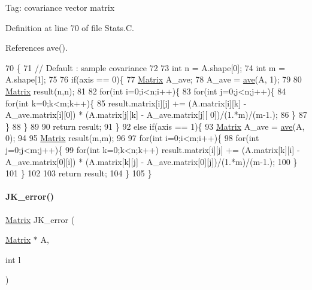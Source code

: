 Tag\+: covariance vector matrix 

Definition at line 70 of file Stats.\+C.



References ave().


\begin{DoxyCode}
70                               \{
71   \textcolor{comment}{// Default : sample covariance}
72 
73   \textcolor{keywordtype}{int} n = A.shape[0];
74   \textcolor{keywordtype}{int} m = A.shape[1];
75   
76   \textcolor{keywordflow}{if}(axis == 0)\{
77     \hyperlink{classMatrix}{Matrix} A\_ave;
78     A\_ave = \hyperlink{Stats_8C_ae39b64f2f2f119f1fd195d6ca0583a6f}{ave}(A, 1);
79 
80     \hyperlink{classMatrix}{Matrix} result(n,n);
81 
82     \textcolor{keywordflow}{for}(\textcolor{keywordtype}{int} i=0;i<n;i++)\{
83       \textcolor{keywordflow}{for}(\textcolor{keywordtype}{int} j=0;j<n;j++)\{
84         \textcolor{keywordflow}{for}(\textcolor{keywordtype}{int} k=0;k<m;k++)\{
85           result.matrix[i][j] += (A.matrix[i][k] - A\_ave.matrix[i][0]) * (A.matrix[j][k] - A\_ave.matrix[j][
      0])/(1.*m)/(m-1.);
86         \}
87       \}
88     \}
89 
90     \textcolor{keywordflow}{return} result;
91   \}
92   \textcolor{keywordflow}{else} \textcolor{keywordflow}{if}(axis == 1)\{
93     \hyperlink{classMatrix}{Matrix} A\_ave = \hyperlink{Stats_8C_ae39b64f2f2f119f1fd195d6ca0583a6f}{ave}(A, 0);
94 
95     \hyperlink{classMatrix}{Matrix} result(m,m);
96 
97     \textcolor{keywordflow}{for}(\textcolor{keywordtype}{int} i=0;i<m;i++)\{
98       \textcolor{keywordflow}{for}(\textcolor{keywordtype}{int} j=0;j<m;j++)\{
99         \textcolor{keywordflow}{for}(\textcolor{keywordtype}{int} k=0;k<n;k++) result.matrix[i][j] += (A.matrix[k][i] - A\_ave.matrix[0][i]) * (A.matrix[k][j]
       - A\_ave.matrix[0][j])/(1.*m)/(m-1.);
100       \}
101     \}
102 
103     \textcolor{keywordflow}{return} result;
104   \}
105 \}
\end{DoxyCode}
\mbox{\label{Stats_8C_a0285e96e7ca20265cc8af9eafc5bbb3b}} 
\paragraph{\texorpdfstring{J\+K\+\_\+error()}{JK\_error()}}
{\footnotesize\ttfamily \hyperlink{classMatrix}{Matrix} J\+K\+\_\+error (\begin{DoxyParamCaption}\item[{\hyperlink{classMatrix}{Matrix} $\ast$}]{A,  }\item[{int}]{l }\end{DoxyParamCaption})}



